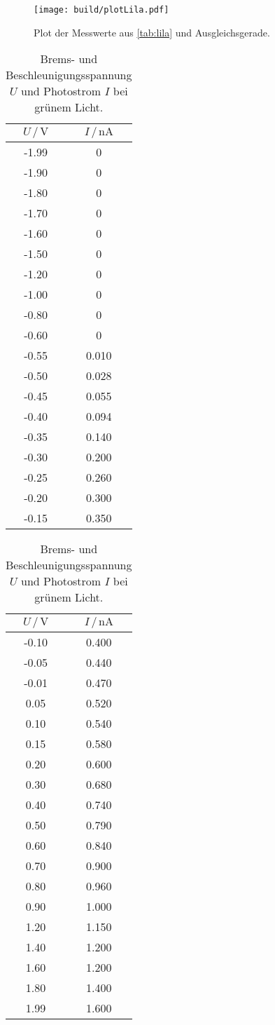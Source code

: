 \begin{figure}
  \centering
  \texttt{[image: build/plotLila.pdf]}
  \caption{Plot der Messwerte aus \autoref{tab:lila} und Ausgleichsgerade.}
  \label{fig:plot_lila}
\end{figure}

\begin{table}[H]
  \centering
  \caption{Brems- und Beschleunigungsspannung $U$ und Photostrom $I$ bei grünem Licht.}
  \begin{tabular}{|c|c|}
    \toprule
    $U \,/\, \si{\volt}$ & $I \,/\, \si{\nano\ampere}$\\
    \midrule
    -1.99 & 0\\
    -1.90 & 0\\
    -1.80 & 0\\
    -1.70 & 0\\
    -1.60 & 0\\
    -1.50 & 0\\
    -1.20 & 0\\
    -1.00 & 0\\
    -0.80 & 0\\
    -0.60 & 0\\
    -0.55 & 0.010\\
    -0.50 & 0.028\\
    -0.45 & 0.055\\
    -0.40 & 0.094\\
    -0.35 & 0.140\\
    -0.30 & 0.200\\
    -0.25 & 0.260\\
    -0.20 & 0.300\\
    -0.15 & 0.350\\
    \bottomrule
  \end{tabular}
  \begin{tabular}{|c|c|}
    \toprule
    $U \,/\, \si{\volt}$ & $I \,/\, \si{\nano\ampere}$\\
    \midrule
    -0.10 & 0.400\\
    -0.05 & 0.440\\
    -0.01 & 0.470\\
    0.05 & 0.520\\
    0.10 & 0.540\\
    0.15 & 0.580\\
    0.20 & 0.600\\
    0.30 & 0.680\\
    0.40 & 0.740\\
    0.50 & 0.790\\
    0.60 & 0.840\\
    0.70 & 0.900\\
    0.80 & 0.960\\
    0.90 & 1.000\\
    1.20 & 1.150\\
    1.40 & 1.200\\
    1.60 & 1.200\\
    1.80 & 1.400\\
    1.99 & 1.600\\
    \bottomrule
  \end{tabular}
  \label{tab:gruen}
\end{table}

